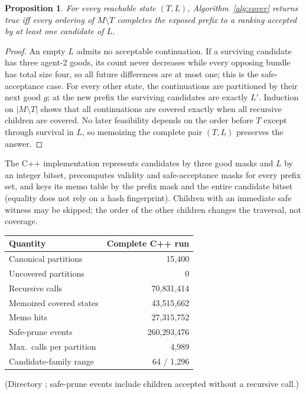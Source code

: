 \documentclass[11pt]{article}
\newtheorem{proposition}[theorem]{Proposition}
\theoremstyle{definition}
\begin{document}
\begin{proposition}
For every reachable state $(T,L)$, Algorithm~\ref{alg:cover} returns true iff every ordering of $M\setminus T$ completes the exposed prefix to a ranking accepted by at least one candidate of $L$.
\end{proposition}
\begin{proof}
An empty $L$ admits no acceptable continuation. If a surviving candidate has three agent-2 goods, its count never decreases while every opposing bundle has total size four, so all future differences are at most one; this is the safe-acceptance case. For every other state, the continuations are partitioned by their next good $g$; at the new prefix the surviving candidates are exactly $L'$. Induction on $|M\setminus T|$ shows that all continuations are covered exactly when all recursive children are covered. No later feasibility depends on the order before $T$ except through survival in $L$, so memoizing the complete pair $(T,L)$ preserves the answer.
\end{proof}
The C++ implementation represents candidates by three good masks and $L$ by an integer bitset, precomputes validity and safe-acceptance masks for every prefix set, and keys its memo table by the prefix mask and the entire candidate bitset (equality does not rely on a hash fingerprint). Children with an immediate safe witness may be skipped; the order of the other children changes the traversal, not coverage.
\begin{center}\small
\begin{tabular}{@{}lr@{}}
\toprule
Quantity & Complete C++ run\\ \midrule
Canonical partitions & 15{,}400\\
Uncovered partitions & 0\\
Recursive calls & 70{,}831{,}414\\
Memoized covered states & 43{,}515{,}662\\
Memo hits & 27{,}315{,}752\\
Safe-prune events & 260{,}293{,}476\\
Max.\ calls per partition & 4{,}989\\
Candidate-family range & 64 / 1{,}296\\
\bottomrule
\end{tabular}
\end{center}
(Directory ; safe-prune events include children accepted without a recursive call.)
\end{document}
